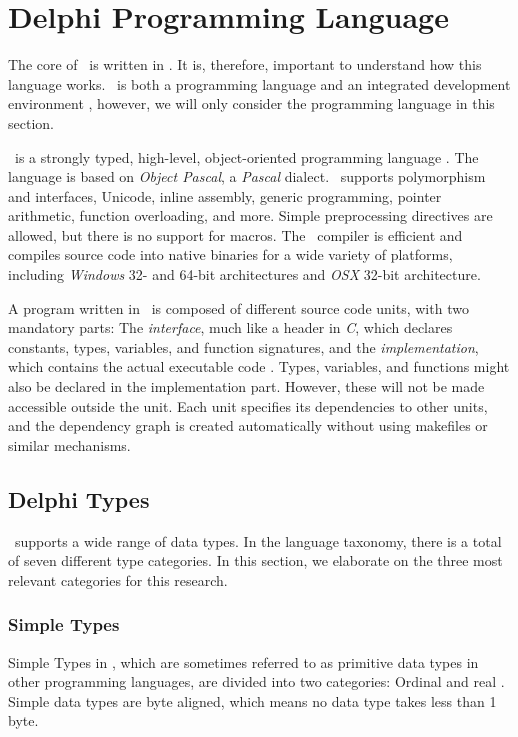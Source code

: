 \section{Delphi Programming Language}
\label{sec:Delphi Programming Language}
The core of \gap~is written in \delphi. It is, therefore, important to understand how this language works. \delphi~is both a programming language and an integrated development environment \cite{Wikipedia_contributors2016-jk}, however, we will only consider the programming language in this section.

\delphi~is a strongly typed, high-level, object-oriented programming language \cite{noauthor_undated-cn, Wikipedia_contributors2016-jk}. The language is based on \textit{Object Pascal}, a \textit{Pascal} dialect. \delphi~supports polymorphism and interfaces, Unicode, inline assembly, generic programming, pointer arithmetic, function overloading, and more. Simple preprocessing directives are allowed, but there is no support for macros. The \delphi~compiler is efficient and compiles source code into native binaries for a wide variety of platforms, including \textit{Windows} 32- and 64-bit architectures and \textit{OSX} 32-bit architecture.

A program written in \delphi~is composed of different source code units, with two mandatory parts: The \textit{interface}, much like a header in \textit{C}, which declares constants, types, variables, and function signatures, and the \textit{implementation}, which contains the actual executable code \cite{noauthor_undated-pl}. Types, variables, and functions might also be declared in the implementation part. However, these will not be made accessible outside the unit. Each unit specifies its dependencies to other units, and the dependency graph is created automatically without using makefiles or similar mechanisms.

\subsection{Delphi Types}
\label{sub:Delphi Types}
\delphi~supports a wide range of data types. In the language taxonomy, there is a total of seven different type categories. In this section, we elaborate on the three most relevant categories for this research.

\subsubsection{Simple Types}
\label{ssub:Simple Types}
Simple Types in \delphi, which are sometimes referred to as primitive data types in other programming languages, are divided into two categories: Ordinal and real \cite{noauthor_undated-st}. Simple data types are byte aligned, which means no data type takes less than 1 byte.

